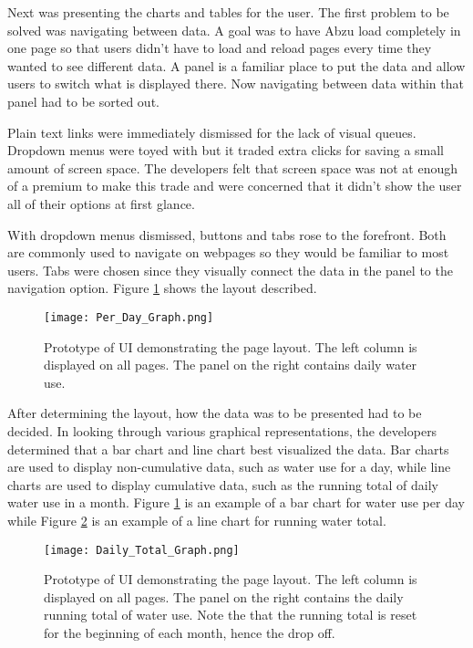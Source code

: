 \documentclass[journal]{IEEEtran}
\begin{document}
Next was presenting the charts and tables for the user. The first problem to be solved was navigating between data. A goal was to have Abzu load completely in one page so that users didn't have to load and reload pages every time they wanted to see different data. A panel is a familiar place to put the data and allow users to switch what is displayed there. Now navigating between data within that panel had to be sorted out.

Plain text links were immediately dismissed for the lack of visual queues. Dropdown menus were toyed with but it traded extra clicks for saving a small amount of screen space. The developers felt that screen space was not at enough of a premium to make this trade and were concerned that it didn't show the user all of their options at first glance.

With dropdown menus dismissed, buttons and tabs rose to the forefront. Both are commonly used to navigate on webpages so they would be familiar to most users. Tabs were chosen since they visually connect the data in the panel to the navigation option. Figure \ref{fig:daygraph} shows the layout described.

\begin{figure}[H]
  \texttt{[image: Per\_Day\_Graph.png]}
  \caption{Prototype of UI demonstrating the page layout. The left column is displayed on all pages. The panel on the right contains daily water use.}
  \label{fig:daygraph}
\end{figure}

After determining the layout, how the data was to be presented had to be decided. In looking through various graphical representations, the developers determined that a bar chart and line chart best visualized the data. Bar charts are used to display non-cumulative data, such as water use for a day, while line charts are used to display cumulative data, such as the running total of daily water use in a month. Figure \ref{fig:daygraph} is an example of a bar chart for water use per day while Figure \ref{fig:daytotal} is an example of a line chart for running water total.

\begin{figure}[H]
  \texttt{[image: Daily\_Total\_Graph.png]}
  \caption{Prototype of UI demonstrating the page layout. The left column is displayed on all pages. The panel on the right contains the daily running total of water use. Note the that the running total is reset for the beginning of each month, hence the drop off.}
  \label{fig:daytotal}
\end{figure}
\end{document}

